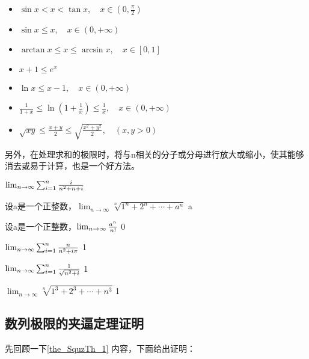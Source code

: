 \begin{itemize}
\item $\sin x < x < \tan x, \quad x \in \left(0, \frac{\pi}{2}\right)$
\item $\sin x \leq x, \quad x \in (0, +\infty)$
\item $\arctan x \leq x \leq \arcsin x, \quad x \in [0, 1] $
\item $x + 1\leq e^x$
\item $\ln x\leq x - 1 , \quad x \in (0, +\infty)$
\item $\frac{1}{1 + x} \leq \ln\left(1 + \frac{1}{x}\right) \leq \frac{1}{x}, \quad x \in (0, +\infty)$
\item $\sqrt{xy} \leq \frac{x + y}{2} \leq \sqrt{\frac{x^2 + y^2}{2}}, \quad (x, y > 0)$
\end{itemize}

\begin{example}{}

\end{example}
另外，在处理求和的极限时，将与n相关的分子或分母进行放大或缩小，使其能够消去或易于计算，也是一个好方法。
\begin{example}{$\lim_{n\to \infty}\sum_{i=1}^n{i\over n^2+n+i}$}
\end{example}



\begin{example}{设a是一个正整数，$\lim_{n\to\infty}\sqrt[n]{1^n+2^n+\cdots+a^n}$}
a
\end{example}
\begin{example}{设a是一个正整数，$\lim_{n\to\infty}{a^n\over n!}$}
0
\end{example}
\begin{example}{$\lim_{n\to\infty}\sum_{i=1}^n{n\over n^2+i\pi}$}
1
\end{example}
\begin{example}{$\lim_{n\to\infty}\sum_{i=1}^n{1\over\sqrt{n^2+i}}$}
1
\end{example}

\begin{example}{$\lim_{n\to\infty}\sqrt[n]{1^3+2^3+\cdots+n^3}$}
1
\end{example}
\subsection{数列极限的夹逼定理证明}

先回顾一下\autoref{the_SquzTh_1} 内容，下面给出证明：

